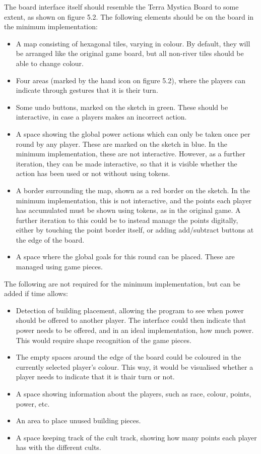 The board interface itself should resemble the Terra Mystica Board to some extent, as shown on figure 5.2. The following elements should be on the board in the minimum implementation:
\begin{itemize}
\item A map consisting of hexagonal tiles, varying in colour. By default, they will be arranged like the original game board, but all non-river tiles should be able to change colour.
\item Four areas (marked by the hand icon on figure 5.2), where the players can indicate through gestures that it is their turn.
\item Some undo buttons, marked on the sketch in green. These should be interactive, in case a players makes an incorrect action.
\item A space showing the global power actions which can only be taken once per round by any player. These are marked on the sketch in blue. In the minimum implementation, these are not interactive. However, as a further iteration, they can be made interactive, so that it is visible whether the action has been used or not without using tokens.
\item A border surrounding the map, shown as a red border on the sketch. In the minimum implementation, this is not interactive, and the points each player has accumulated must be shown using tokens, as in the original game. A further iteration to this could be to instead manage the points digitally, either by touching the point border itself, or adding add/subtract buttons at the edge of the board.
\item A space where the global goals for this round can be placed. These are managed using game pieces.
\end{itemize}

The following are not required for the minimum implementation, but can be added if time allows:
\begin{itemize}
\item Detection of building placement, allowing the program to see when power should be offered to another player. The interface could then indicate that power needs to be offered, and in an ideal implementation, how much power. This would require shape recognition of the game pieces.
\item The empty spaces around the edge of the board could be coloured in the currently selected player's colour. This way, it would be visualised whether a player needs to indicate that it is thair turn or not.
\item A space showing information about the players, such as race, colour, points, power, etc.
\item An area to place unused building pieces.
\item A space keeping track of the cult track, showing how many points each player has with the different cults.
\end{itemize}

